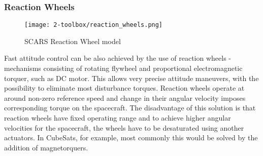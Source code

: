        


    \subsubsection{Reaction Wheels}
        \begin{figure}[H]
            \centering
            \texttt{[image: 2-toolbox/reaction\_wheels.png]}
            \caption{SCARS Reaction Wheel model}
            \label{fig:reaction_wheels}
        \end{figure}

        
        Fast attitude control can be also achieved by the use of reaction wheels - mechanisms consisting of rotating flywheel and proportional electromagnetic torquer, such as DC motor. This allows very precise attitude maneuvers, with the possibility to eliminate most disturbance torques. Reaction wheels operate at around non-zero reference speed and change in their angular velocity imposes corresponding torque on the spacecraft. The disadvantage of this solution is that reaction wheels have fixed operating range and to achieve higher angular velocities for the spacecraft, the wheels have to be desaturated using another actuators. In CubeSats, for example, most commonly this would be solved by the addition of magnetorquers.

